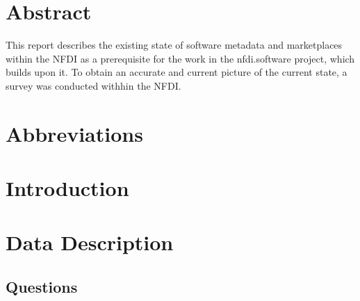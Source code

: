 \documentclass[headsepline,titlepage,twoside,12pt,toc=flat,headings=normal]{scrreprt}
\author{\theauthor}
\date{\thedate}
\title{\thetitle}
\subtitle{Deliverable 2.2}
\begin{document}
\maketitle
\imprint

\chapter*{Abstract}\label{ch:abstract}

This report describes the existing state of software metadata and marketplaces within the NFDI as a prerequisite for the work in the nfdi.software project, which builds upon it.
To obtain an accurate and current picture of the current state, a survey was conducted withhin the NFDI.

\chapter*{Abbreviations}%

\begin{acronym}
\end{acronym}

\tableofcontents
{}

\chapter{Introduction}\label{ch:introduction}

\chapter{Data Description}\label{ch:introduction}

\section{Questions}
\end{document}
